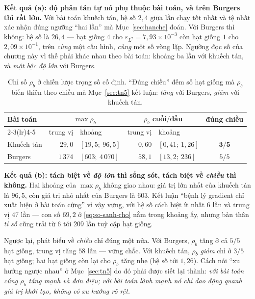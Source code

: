 \textbf{Kết quả (a): độ phân tán tự nó phụ thuộc bài toán, và trên Burgers thì
rất lớn.} Với bài toán khuếch tán, hệ số $2{,}4$ giữa lần chạy tốt nhất và tệ
nhất xác nhận đúng ngưỡng ``hai lần'' mà Mục~\ref{sec:hanche} đoán. Với Burgers
thì không: hệ số là $26{,}4$ --- hạt giống $4$ cho
$\varepsilon_{L^2} = 7{,}93\times10^{-3}$ còn hạt giống $1$ cho
$2{,}09\times10^{-1}$, trên \emph{cùng} một cấu hình, \emph{cùng} một số vòng
lặp. Ngưỡng đọc số của chương này vì thế phải khác nhau theo bài toán: khoảng ba
lần với khuếch tán, và \emph{một bậc độ lớn} với Burgers.

\begin{table}[H]
\centering
\caption[Chỉ số mất cân bằng gradient trên năm hạt giống]{Chỉ số $\rho_b$ ở
chiến lược trọng số cố định. ``Đúng chiều'' đếm số hạt giống mà $\rho_b$ biến
thiên theo chiều mà Mục~\ref{sec:tn5} kết luận: \emph{tăng} với Burgers,
\emph{giảm} với khuếch tán.}
\label{tab:tn8-rho}
\small
\setlength{\tabcolsep}{5pt}
\begin{tabular}{@{}l r l r l c@{}}
\toprule
\textbf{Bài toán} & \multicolumn{2}{c}{$\max\rho_b$}
& \multicolumn{2}{c}{$\rho_b$ cuối$/$đầu} & \textbf{đúng chiều} \\
\cmidrule(lr){2-3}\cmidrule(lr){4-5}
& trung vị & khoảng & trung vị & khoảng & \\
\midrule
Khuếch tán & $29{,}0$   & $[19{,}5;\ 96{,}5]$   & $0{,}60$ & $[0{,}41;\ 1{,}26]$
  & $\mathbf{3/5}$ \\
Burgers    & $1\,374$   & $[603;\ 4\,070]$      & $58{,}1$ & $[13{,}2;\ 236]$
  & $5/5$ \\
\bottomrule
\end{tabular}
\end{table}

\textbf{Kết quả (b): tách biệt về \emph{độ lớn} thì sống sót, tách biệt về
\emph{chiều} thì không.} Hai khoảng của $\max\rho_b$ không giao nhau: giá trị
lớn nhất của khuếch tán là $96{,}5$, còn giá trị nhỏ nhất của Burgers là $603$.
Kết luận ``bệnh lý gradient chỉ xuất hiện ở bài toán cứng'' vì vậy vững, với hệ
số cách biệt ít nhất $6$ lần và trung vị $47$ lần --- con số $69{,}2$ ở
\eqref{eq:so-sanh-rho} nằm trong khoảng ấy, nhưng bản thân \emph{tỉ số} cũng
trải từ $6$ tới $209$ lần tuỳ cặp hạt giống.

Ngược lại, phát biểu về \emph{chiều} chỉ đúng một nửa. Với Burgers, $\rho_b$
tăng ở cả $5/5$ hạt giống, trung vị tăng $58$ lần --- vững chắc. Với khuếch tán,
$\rho_b$ \emph{giảm} chỉ ở $3/5$ hạt giống; hai hạt giống còn lại cho $\rho_b$
tăng nhẹ (hệ số tới $1{,}26$). Cách nói ``xu hướng ngược nhau'' ở
Mục~\ref{sec:tn5} do đó phải được siết lại thành: \emph{với bài toán cứng
$\rho_b$ tăng mạnh và đơn điệu; với bài toán lành mạnh nó chỉ dao động quanh giá
trị khởi tạo, không có xu hướng rõ rệt.}

